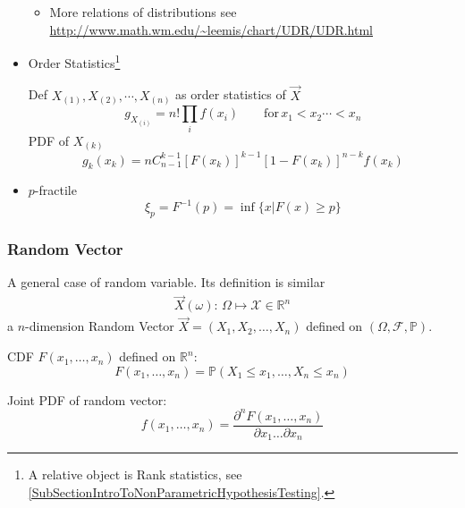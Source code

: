 \begin{itemize}
\begin{itemize}[topsep=2pt,itemsep=0pt]
            
            
            
            \item More relations of distributions see \url{http://www.math.wm.edu/~leemis/chart/UDR/UDR.html}
            
            
        \end{itemize}
        
        \item Order Statistics\footnote{A relative object is Rank statistics, see \autoref{SubSectionIntroToNonParametricHypothesisTesting}.}
        
        Def $X_{(1)},X_{(2)},\cdots,X_{(n)}$ as order statistics of $\vec{X}$
        \begin{equation}    
            g_{X_{(i)}}=n!\prod_i f(x_i)\qquad \mathrm{for}\, x_1<x_2\cdots <x_n    
        \end{equation}
        PDF of $X_{(k)}$
        \begin{equation}\label{EqaDistributionOfOrderStatistics} 
            g_k(x_k)=nC_{n-1}^{k-1}[F(x_k)]^{k-1}[1-F(x_k)]^{n-k}f(x_k)
        \end{equation}
        \item $p$-fractile
        \begin{equation}    \xi_p=F^{-1}(p)=\inf\{x|F(x)\geq p\}\end{equation}
    \end{itemize}






\subsubsection{Random Vector}
    A general case of random variable. Its definition is similar    
    \begin{align}
        \vec{X}(\omega ):\, \Omega \mapsto \mathscr{X}\in\mathbb{R}^n 
    \end{align}
    a $n$-dimension Random Vector $\vec{X}=(X_1,X_2,\ldots,X_n)$ defined on $(\Omega,\mathscr{F},\mathbb{P})$.

    CDF $F(x_1,\ldots,x_n)$ defined on $\mathbb{R}^n$:
    \begin{equation}F(x_1,\ldots,x_n)=\mathbb{P}(X_1\leq x_1,\ldots,X_n\leq x_n)\end{equation}

    Joint PDF of random vector: 
    \begin{equation}
        f(x_1,\ldots,x_n)=\dfrac{\partial^n F(x_1,\ldots,x_n)}{\partial x_1\ldots\partial x_n}
    \end{equation}

